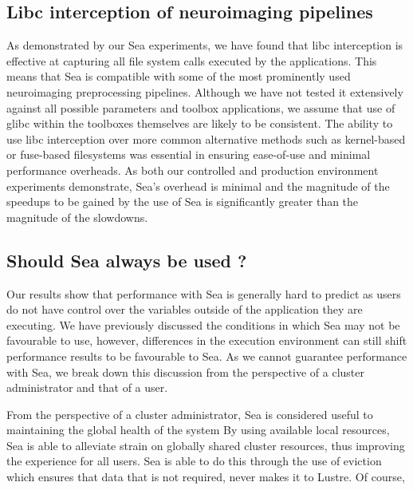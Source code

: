     \subsection{Libc interception of neuroimaging pipelines}
    
    As demonstrated by our Sea experiments, we have found that libc interception
    is effective at capturing all file system calls executed by the
    applications. This means that Sea is compatible with some of the most prominently
    used neuroimaging preprocessing pipelines. Although we have not tested it extensively
    against all possible parameters and toolbox applications, we assume that use
    of glibc within the toolboxes themselves are likely to be consistent.
    The ability to use libc interception over more common alternative methods
    such as kernel-based or fuse-based filesystems was essential in ensuring
    ease-of-use and minimal performance overheads. As both our controlled and production
    environment experiments demonstrate, Sea's overhead is minimal and the magnitude of the
    speedups to be gained by the use of Sea is significantly greater than the magnitude of the
    slowdowns.
    
    \subsection{Should Sea always be used ?}
    
    Our results show that performance with Sea is generally hard to predict as users do not have control
    over the variables outside of the application they are executing. We have previously discussed the
    conditions in which Sea may not be favourable to use, however, differences in the execution environment
    can still shift performance results to be favourable to Sea. As we cannot guarantee performance with
    Sea, we break down this discussion from the perspective of a cluster administrator and that of a user.

    From the perspective of a cluster administrator, Sea is considered useful to maintaining the global health of the system By using available local resources, Sea is able to alleviate strain on
    globally shared cluster resources, thus improving the experience for all users. Sea is able to do this
    through the use of eviction which ensures that data that is not required, never makes it to Lustre. Of
    course, 
    
